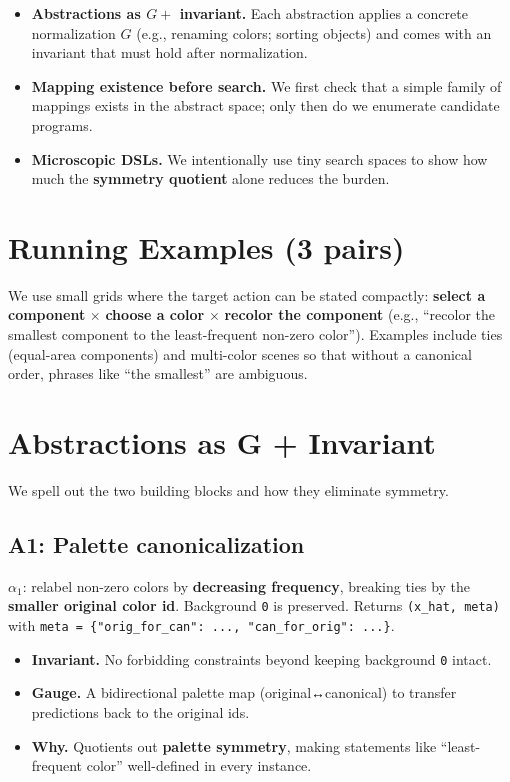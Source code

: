 \documentclass[11pt]{article}
\newcommand{\code}[1]{\texttt{#1}}
\begin{document}
\begin{itemize}
\item \textbf{Abstractions as $G +$ invariant.} Each abstraction applies a concrete normalization $G$ (e.g., renaming colors; sorting objects) and comes with an invariant that must hold after normalization.
\item \textbf{Mapping existence before search.} We first check that a simple family of mappings exists in the abstract space; only then do we enumerate candidate programs.
\item \textbf{Microscopic DSLs.} We intentionally use tiny search spaces to show how much the \textbf{symmetry quotient} alone reduces the burden.
\end{itemize}

\section{Running Examples (3 pairs)}

We use small grids where the target action can be stated compactly: \textbf{select a component} $\times$ \textbf{choose a color} $\times$ \textbf{recolor the component} (e.g., ``recolor the smallest component to the least-frequent non-zero color''). Examples include ties (equal-area components) and multi-color scenes so that without a canonical order, phrases like ``the smallest'' are ambiguous.

\section{Abstractions as G + Invariant}

We spell out the two building blocks and how they eliminate symmetry.

\subsection{A1: Palette canonicalization}

$\alpha_1$: relabel non-zero colors by \textbf{decreasing frequency}, breaking ties by the \textbf{smaller original color id}. Background \code{0} is preserved. Returns \code{(x\_hat, meta)} with \code{meta = \{"orig\_for\_can": ..., "can\_for\_orig": ...\}}.

\begin{itemize}
\item \textbf{Invariant.} No forbidding constraints beyond keeping background \code{0} intact.
\item \textbf{Gauge.} A bidirectional palette map (original↔canonical) to transfer predictions back to the original ids.
\item \textbf{Why.} Quotients out \textbf{palette symmetry}, making statements like ``least-frequent color'' well-defined in every instance.
\end{itemize}
\end{document}
